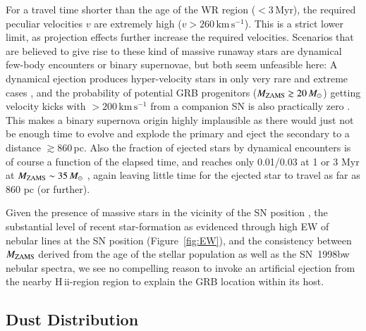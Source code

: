 \documentclass[traditabstract]{aa}
\newcommand{\hii}{\mbox{H\,{\sc ii}}}
\begin{document}
For a travel time shorter than the age of the WR region ($<3$\,Myr), the required peculiar velocities $v$ are extremely high ($v>260\,\mathrm{km\,s^{-1}}$). This is a strict lower limit, as projection effects further increase the required velocities. Scenarios that are believed to give rise to these kind of massive runaway stars are dynamical few-body encounters or binary supernovae, but both seem unfeasible here: A dynamical ejection produces hyper-velocity stars in only very rare and extreme cases \citep{2001A&A...365...49H, 2012ApJ...751..133P}, and the probability of potential GRB progenitors ($M_{\rm{ZAMS}}\gtrsim 20\,M_\odot$) getting velocity kicks with $>200\,\mathrm{km\,s^{-1}}$ from a companion SN is also practically zero \citep{2011MNRAS.414.3501E}. This makes a binary supernova origin highly implausible as there would just not be enough time to evolve and explode the primary and eject the secondary to a distance $\gtrsim860$\,pc. Also the fraction of ejected stars by dynamical encounters is of course a function of the elapsed time, and reaches only 0.01/0.03 at 1 or 3 Myr at $M_{\rm{ZAMS}}\sim 35\,M_\odot$ \citep{2012ApJ...746...15B}, again leaving little time for the ejected star to travel as far as 860 pc (or further).

Given the presence of massive stars in the vicinity of the SN position \citep{2000ApJ...542L..89F}, the substantial level of recent star-formation as evidenced through high EW of nebular lines at the SN position (Figure~\ref{fig:EW}), and the consistency between $M_{\rm{ZAMS}}$ derived from the age of the stellar population as well as the SN~1998bw nebular spectra, we see no compelling reason to invoke an artificial ejection from the nearby \hii-region region to explain the GRB location within its host.

\subsection{Dust Distribution}
\end{document}
